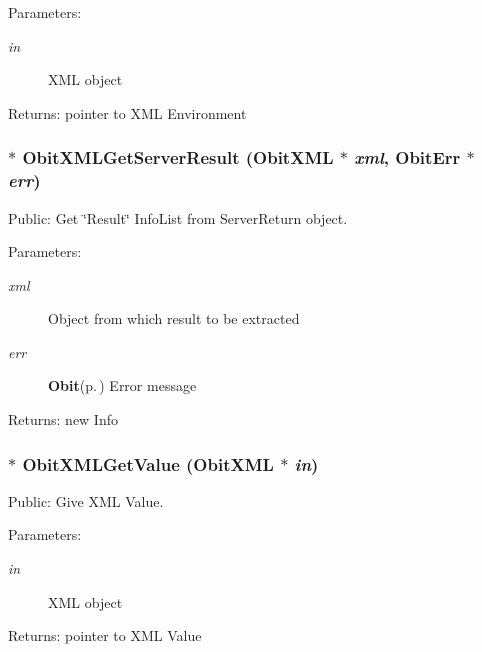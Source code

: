 \begin{Desc}
\item[Parameters:]
\begin{description}
\item[{\em in}]XML object \end{description}
\end{Desc}
\begin{Desc}
\item[Returns:]pointer to XML Environment \end{Desc}
\subsubsection{$\ast$ Obit\-XMLGet\-Server\-Result ({\bf Obit\-XML} $\ast$ {\em xml}, {\bf Obit\-Err} $\ast$ {\em err})}\label{ObitXML_8h_a34}


Public: Get \char`\"{}Result\char`\"{} Info\-List from Server\-Return object. 

\begin{Desc}
\item[Parameters:]
\begin{description}
\item[{\em xml}]Object from which result to be extracted \item[{\em err}]{\bf Obit}{\rm (p.\,\pageref{structObit})} Error message \end{description}
\end{Desc}
\begin{Desc}
\item[Returns:]new Info \end{Desc}
\subsubsection{$\ast$ Obit\-XMLGet\-Value ({\bf Obit\-XML} $\ast$ {\em in})}\label{ObitXML_8h_a20}


Public: Give XML Value. 

\begin{Desc}
\item[Parameters:]
\begin{description}
\item[{\em in}]XML object \end{description}
\end{Desc}
\begin{Desc}
\item[Returns:]pointer to XML Value \end{Desc}
